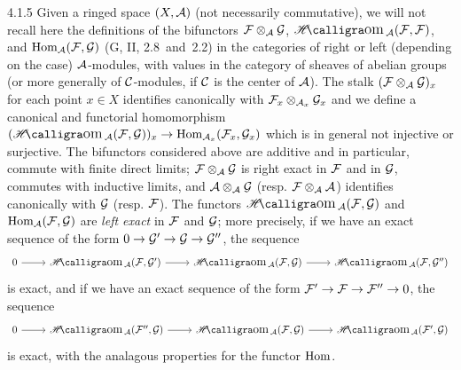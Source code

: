 \documentclass[../main.tex]{subfiles}
\begin{document}
\begin{env}{4.1.5}
Given a ringed space $(X,\mathcal{A})$ (not necessarily commutative), we will not recall here the definitions of the
bifunctors $\mathcal{F}\otimes_{\mathcal{A}}\mathcal{G}$, $\sheafHom_{\sheaf{A}}(\sheaf{F},\sheaf{F})$, and
$\operatorname{Hom}_{\mathcal{A}}(\mathcal{F},\mathcal{G})$ (G, II, 2.8~and~2.2) in the categories of right or left (depending on
the case) $\mathcal{A}$-modules, with values in the category of sheaves of abelian groups (or more generally
of $\mathcal{C}$-modules, if $\mathcal{C}$ is the center of $\mathcal{A}$). The stalk $(\mathcal{F}\otimes_{\mathcal{A}}\mathcal{G})_x$
for each point $x\in X$ identifies canonically with $\mathcal{F}_x\otimes_{\mathcal{A}_x}\mathcal{G}_x$ and we define a
canonical and functorial homomorphism $(\sheafHom_{\sheaf{A}}(\sheaf{F},\sheaf{G}))_x\to\Hom_{\sheaf{A}_x}(\sheaf{F}_x,\sheaf{G}_x)$
which is in general not injective or surjective. The bifunctors considered above are additive and in particular,
commute with finite direct limits; $\mathcal{F}\otimes_{\mathcal{A}}\mathcal{G}$ is right exact in $\mathcal{F}$ and in $\mathcal{G}$,
commutes with inductive limits, and $\mathcal{A}\otimes_{\mathcal{A}}\mathcal{G}$ (resp. $\mathcal{F}\otimes_{\mathcal{A}}\mathcal{A}$)
identifies canonically with $\mathcal{G}$ (resp. $\mathcal{F}$). The functors $\sheafHom_{\sheaf{A}}(\sheaf{F},\sheaf{G})$ and
$\operatorname{Hom}_{\mathcal{A}}(\mathcal{F},\mathcal{G})$ are \emph{left exact} in $\mathcal{F}$ and $\mathcal{G}$; more precisely,
if we have an exact sequence of the form $0\to\mathcal{G}'\to\mathcal{G}\to\mathcal{G}''$, the sequence
\[
  \begin{tikzcd}
    0\ar[r] &\sheafHom_{\sheaf{A}}(\sheaf{F},\sheaf{G}')\ar[r] &
    \sheafHom_{\sheaf{A}}(\sheaf{F},\sheaf{G})\ar[r] &
    \sheafHom_{\sheaf{A}}(\sheaf{F},\sheaf{G}'')
  \end{tikzcd}
\]
is exact, and if we have an exact sequence of the form $\mathcal{F}'\to\mathcal{F}\to\mathcal{F}''\to 0$, the sequence
\[
  \begin{tikzcd}
    0\ar[r] &\sheafHom_{\sheaf{A}}(\sheaf{F}'',\sheaf{G})\ar[r] &
    \sheafHom_{\sheaf{A}}(\sheaf{F},\sheaf{G})\ar[r] &
    \sheafHom_{\sheaf{A}}(\sheaf{F}',\sheaf{G})
  \end{tikzcd}
\]
is exact, with the analagous properties for the functor $\operatorname{Hom}$.

\end{env}

\end{document}
